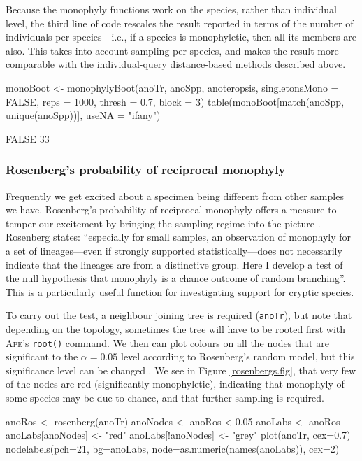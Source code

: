 \documentclass{article}
\newcommand{\progname}[1]{\textsc{#1}}
\newcommand{\fun}[1]{\texttt{#1}}
\begin{document}
Because the monophyly functions work on the species, rather than individual level, the third line of code rescales the result reported in terms of the number of individuals per species---i.e., if a species is monophyletic, then all its members are also. This takes into account sampling per species, and makes the result more comparable with the individual-query distance-based methods described above.

\begin{console}
monoBoot <- monophylyBoot(anoTr, anoSpp, anoteropsis, 
singletonsMono = FALSE, reps = 1000, thresh = 0.7, block = 3)
table(monoBoot[match(anoSpp, unique(anoSpp))], useNA = "ifany")
\end{console}

\begin{Routput}
FALSE 
   33
\end{Routput}

\subsubsection{Rosenberg's probability of reciprocal monophyly}
Frequently we get excited about a specimen being different from other samples we have. Rosenberg's probability of reciprocal monophyly offers a measure to temper our excitement by bringing the sampling regime into the picture \citep{Rosenberg2007}. Rosenberg states: ``especially for small samples, an observation of monophyly for a set of lineages---even if strongly supported statistically---does not necessarily indicate that the lineages are from a distinctive group. Here I develop a test of the null hypothesis that monophyly is a chance outcome of random branching''. This is a particularly useful function for investigating support for cryptic species.

To carry out the test, a neighbour joining tree is required (\fun{anoTr}), but note that depending on the topology, sometimes the tree will have to be rooted first with \progname{Ape}'s \fun{root()} command. We then can plot colours on all the nodes that are significant to the $\alpha = 0.05$ level according to Rosenberg's random model, but this significance level can be changed \citep{Rosenberg2007}. We see in Figure \ref{rosenbergs.fig}, that very few of the nodes are red (significantly monophyletic), indicating that monophyly of some species may be due to chance, and that further sampling is required. 

\begin{console}
anoRos <- rosenberg(anoTr)
anoNodes <- anoRos < 0.05
anoLabs <- anoRos
anoLabs[anoNodes] <- "red"
anoLabs[!anoNodes] <- "grey"
plot(anoTr, cex=0.7)
nodelabels(pch=21, bg=anoLabs, node=as.numeric(names(anoLabs)), cex=2)
\end{console}
\end{document}
